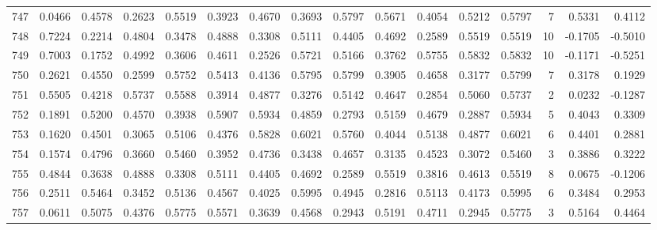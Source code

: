 \begin{tabular}{lrrrrrrrrrrrrrrr}
747 &      0.0466 &  0.4578 &  0.2623 &  0.5519 &  0.3923 &  0.4670 &  0.3693 &  0.5797 &  0.5671 &  0.4054 &   0.5212 &     0.5797 &      7 &                    0.5331 &                     0.4112 \\
748 &      0.7224 &  0.2214 &  0.4804 &  0.3478 &  0.4888 &  0.3308 &  0.5111 &  0.4405 &  0.4692 &  0.2589 &   0.5519 &     0.5519 &     10 &                   -0.1705 &                    -0.5010 \\
749 &      0.7003 &  0.1752 &  0.4992 &  0.3606 &  0.4611 &  0.2526 &  0.5721 &  0.5166 &  0.3762 &  0.5755 &   0.5832 &     0.5832 &     10 &                   -0.1171 &                    -0.5251 \\
750 &      0.2621 &  0.4550 &  0.2599 &  0.5752 &  0.5413 &  0.4136 &  0.5795 &  0.5799 &  0.3905 &  0.4658 &   0.3177 &     0.5799 &      7 &                    0.3178 &                     0.1929 \\
751 &      0.5505 &  0.4218 &  0.5737 &  0.5588 &  0.3914 &  0.4877 &  0.3276 &  0.5142 &  0.4647 &  0.2854 &   0.5060 &     0.5737 &      2 &                    0.0232 &                    -0.1287 \\
752 &      0.1891 &  0.5200 &  0.4570 &  0.3938 &  0.5907 &  0.5934 &  0.4859 &  0.2793 &  0.5159 &  0.4679 &   0.2887 &     0.5934 &      5 &                    0.4043 &                     0.3309 \\
753 &      0.1620 &  0.4501 &  0.3065 &  0.5106 &  0.4376 &  0.5828 &  0.6021 &  0.5760 &  0.4044 &  0.5138 &   0.4877 &     0.6021 &      6 &                    0.4401 &                     0.2881 \\
754 &      0.1574 &  0.4796 &  0.3660 &  0.5460 &  0.3952 &  0.4736 &  0.3438 &  0.4657 &  0.3135 &  0.4523 &   0.3072 &     0.5460 &      3 &                    0.3886 &                     0.3222 \\
755 &      0.4844 &  0.3638 &  0.4888 &  0.3308 &  0.5111 &  0.4405 &  0.4692 &  0.2589 &  0.5519 &  0.3816 &   0.4613 &     0.5519 &      8 &                    0.0675 &                    -0.1206 \\
756 &      0.2511 &  0.5464 &  0.3452 &  0.5136 &  0.4567 &  0.4025 &  0.5995 &  0.4945 &  0.2816 &  0.5113 &   0.4173 &     0.5995 &      6 &                    0.3484 &                     0.2953 \\
757 &      0.0611 &  0.5075 &  0.4376 &  0.5775 &  0.5571 &  0.3639 &  0.4568 &  0.2943 &  0.5191 &  0.4711 &   0.2945 &     0.5775 &      3 &                    0.5164 &                     0.4464 \\

\end{tabular}
